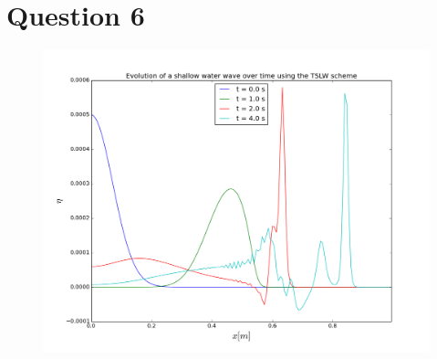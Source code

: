 \documentclass[a4paper,12pt]{article}
\begin{document}
\section{Question 6}

\begin{figure}[H]
\centering
\includegraphics[width = \linewidth]{lab8q6.png}
\caption{}
\label{fig:q6}
\end{figure}
\end{document}
